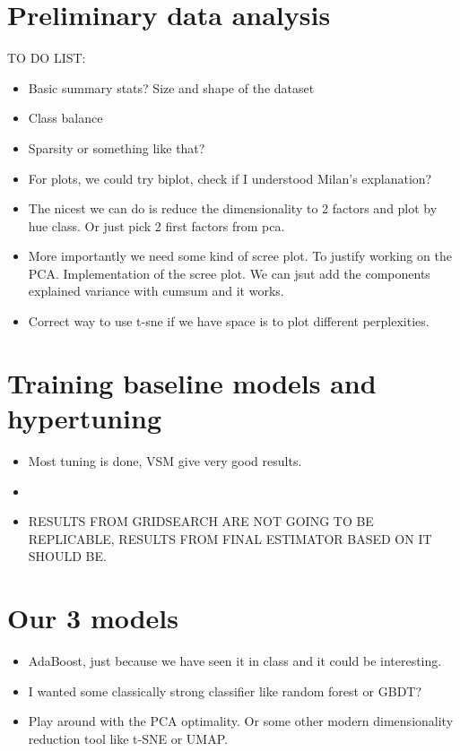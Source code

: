 \documentclass{article}
\begin{document}
\section{Preliminary data analysis}

TO DO LIST:
\begin{itemize}
    \item Basic summary stats? Size and shape of the dataset
    \item Class balance
    \item Sparsity or something like that?
    \item For plots, we could try biplot, check if I understood Milan's explanation?
    \item The nicest we can do is reduce the dimensionality to 2 factors and plot by hue class. 
    Or just pick 2 first factors from pca.
    \item More importantly we need some kind of scree plot. To justify working on the PCA. Implementation of the scree plot. We can 
    jsut add the components explained variance with cumsum and it works.
    \item Correct way to use t-sne if we have space is to plot different perplexities.
\end{itemize}


\section{Training baseline models and hypertuning}

\begin{itemize}
    \item Most tuning is done, VSM give very good results.
    \item 
    \item RESULTS FROM GRIDSEARCH ARE NOT GOING TO BE REPLICABLE, RESULTS FROM FINAL ESTIMATOR BASED ON IT SHOULD BE.
\end{itemize}


\section{Our 3 models}

\begin{itemize}
    \item AdaBoost, just because we have seen it in class and it could be interesting.
    \item I wanted some classically strong classifier like random forest or GBDT?
    \item Play around with the PCA optimality. Or some other modern dimensionality reduction tool like t-SNE or UMAP. 
\end{itemize}

\section{}
\end{document}
